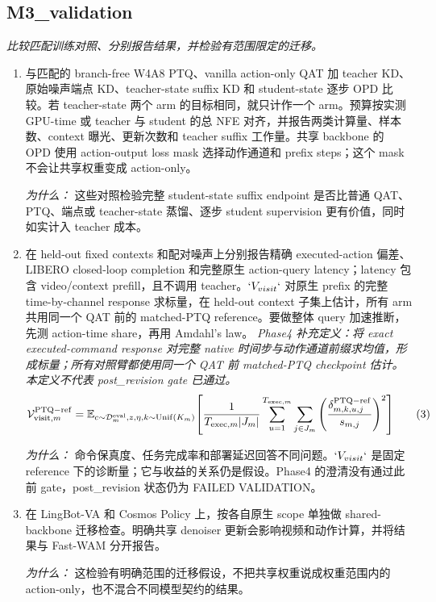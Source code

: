 \documentclass[10pt,a4paper]{article}
\begin{document}
\subsection*{M3\_validation}
\emph{比较匹配训练对照、分别报告结果，并检验有范围限定的迁移。}
\begin{enumerate}[leftmargin=*,start=5]
  \item 与匹配的 branch-free W4A8 PTQ、vanilla action-only QAT 加 teacher KD、原始噪声端点 KD、teacher-state suffix KD 和 student-state 逐步 OPD 比较。若 teacher-state 两个 arm 的目标相同，就只计作一个 arm。预算按实测 GPU-time 或 teacher 与 student 的总 NFE 对齐，并报告两类计算量、样本数、context 曝光、更新次数和 teacher suffix 工作量。共享 backbone 的 OPD 使用 action-output loss mask 选择动作通道和 prefix steps；这个 mask 不会让共享权重变成 action-only。
\par\emph{为什么：} 这些对照检验完整 student-state suffix endpoint 是否比普通 QAT、PTQ、端点或 teacher-state 蒸馏、逐步 student supervision 更有价值，同时如实计入 teacher 成本。
  \item 在 held-out fixed contexts 和配对噪声上分别报告精确 executed-action 偏差、LIBERO closed-loop completion 和完整原生 action-query latency；latency 包含 video/context prefill，且不调用 teacher。\(`V_{visit}`\) 对原生 prefix 的完整 time-by-channel response 求标量，在 held-out context 子集上估计，所有 arm 共用同一个 QAT 前的 matched-PTQ reference。要做整体 query 加速推断，先测 action-time share，再用 Amdahl's law。
\noindent\emph{Phase4 补充定义：将 exact executed-command response 对完整 native 时间步与动作通道前缀求均值，形成标量；所有对照臂都使用同一个 QAT 前 matched-PTQ checkpoint 估计。本定义不代表 post\_revision gate 已通过。}
\begin{equation}
\resizebox{\ifdim\width>\linewidth \linewidth\else\width\fi}{!}{$\displaystyle \mathcal{V}^{\mathrm{PTQ-ref}}_{\mathrm{visit},m}=\mathbb{E}_{c\sim\mathcal{D}^{\mathrm{eval}}_m,z,\eta,k\sim\operatorname{Unif}(K_m)}\!\left[\frac{1}{T_{\mathrm{exec},m}|J_m|}\sum_{u=1}^{T_{\mathrm{exec},m}}\sum_{j\in J_m}\left(\frac{\delta^{\mathrm{PTQ-ref}}_{m,k,u,j}}{s_{m,j}}\right)^2\right]$} \tag{3}
\end{equation}
\par\emph{为什么：} 命令保真度、任务完成率和部署延迟回答不同问题。\(`V_{visit}`\) 是固定 reference 下的诊断量；它与收益的关系仍是假设。Phase4 的澄清没有通过此前 gate，post\_revision 状态仍为 FAILED VALIDATION。
  \item 在 LingBot-VA 和 Cosmos Policy 上，按各自原生 scope 单独做 shared-backbone 迁移检查。明确共享 denoiser 更新会影响视频和动作计算，并将结果与 Fast-WAM 分开报告。
\par\emph{为什么：} 这检验有明确范围的迁移假设，不把共享权重说成权重范围内的 action-only，也不混合不同模型契约的结果。
\end{enumerate}
\end{document}
